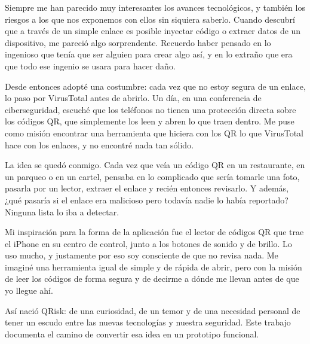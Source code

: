 Siempre me han parecido muy interesantes los avances tecnológicos, y también los riesgos a los que nos exponemos con ellos sin siquiera saberlo. Cuando descubrí que a través de un simple enlace es posible inyectar código o extraer datos de un dispositivo, me pareció algo sorprendente. Recuerdo haber pensado en lo ingenioso que tenía que ser alguien para crear algo así, y en lo extraño que era que todo ese ingenio se usara para hacer daño.

Desde entonces adopté una costumbre: cada vez que no estoy segura de un enlace, lo paso por VirusTotal antes de abrirlo. Un día, en una conferencia de ciberseguridad, escuché que los teléfonos no tienen una protección directa sobre los códigos QR, que simplemente los leen y abren lo que traen dentro. Me puse como misión encontrar una herramienta que hiciera con los QR lo que VirusTotal hace con los enlaces, y no encontré nada tan sólido.

La idea se quedó conmigo. Cada vez que veía un código QR en un restaurante, en un parqueo o en un cartel, pensaba en lo complicado que sería tomarle una foto, pasarla por un lector, extraer el enlace y recién entonces revisarlo. Y además, ¿qué pasaría si el enlace era malicioso pero todavía nadie lo había reportado? Ninguna lista lo iba a detectar.

Mi inspiración para la forma de la aplicación fue el lector de códigos QR que trae el iPhone en su centro de control, junto a los botones de sonido y de brillo. Lo uso mucho, y justamente por eso soy consciente de que no revisa nada. Me imaginé una herramienta igual de simple y de rápida de abrir, pero con la misión de leer los códigos de forma segura y de decirme a dónde me llevan antes de que yo llegue ahí.

Así nació QRisk: de una curiosidad, de un temor y de una necesidad personal de tener un escudo entre las nuevas tecnologías y nuestra seguridad. Este trabajo documenta el camino de convertir esa idea en un prototipo funcional.
